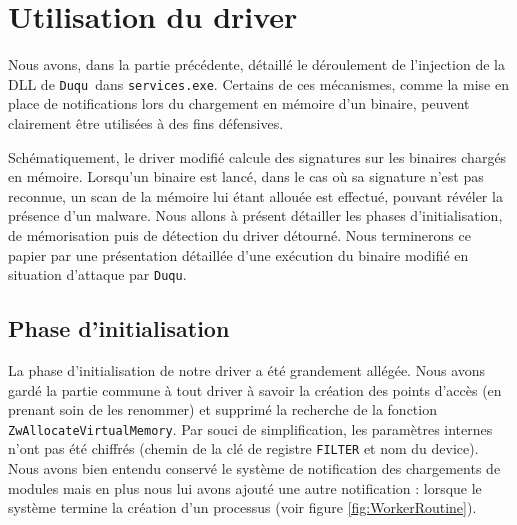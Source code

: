 \documentclass[times,11pt,fullpage]{article}
\newcommand{\Duqu}{\texttt{Duqu}}
\newcommand{\service}{\texttt{services.exe}}
\begin{document}
\section{Utilisation du driver}
\label{section:utilisation}


Nous avons, dans la partie précédente, détaillé le déroulement de l'injection de la DLL de \Duqu\ dans \service. Certains de ces mécanismes, comme la mise en place de notifications lors du chargement en mémoire d'un binaire, peuvent clairement être utilisées à des fins défensives.

Schématiquement, le driver modifié calcule des signatures sur les binaires chargés en mémoire. Lorsqu'un binaire est lancé, dans le cas où sa signature n'est pas reconnue, un scan de la mémoire lui étant allouée est effectué, pouvant révéler la présence d'un malware.
Nous allons à présent détailler les phases d'initialisation, de mémorisation puis de détection du driver détourné. Nous terminerons ce papier par une présentation détaillée d'une exécution du binaire modifié en situation d'attaque par \Duqu.

\subsection{Phase d'initialisation}
La phase d'initialisation de notre driver a été grandement allégée. Nous avons gardé la partie commune à tout driver à savoir la création des points d'accès (en prenant soin de les renommer) et supprimé la recherche de la fonction \texttt{ZwAllocateVirtualMemory}. Par souci de simplification, les paramètres internes n'ont pas été chiffrés (chemin de la clé de registre \texttt{FILTER} et nom du device). Nous avons bien entendu conservé le système de notification des chargements de modules mais en plus nous lui avons ajouté une autre notification : lorsque le système termine la création d'un processus (voir figure \ref{fig:WorkerRoutine}). 
\end{document}
